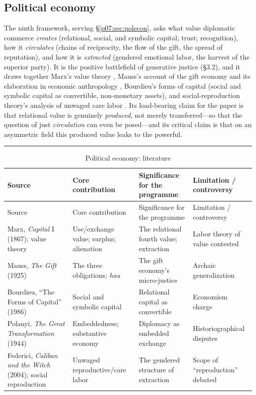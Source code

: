 \documentclass[11pt,a4paper]{article}
\newcommand{\goldrule}{\noindent\textcolor{gold}{\rule{\linewidth}{0.6pt}}\par\vspace{0.4em}}
\newcommand{\xref}[1]{\textcolor{rose}{\S\ref{#1}}}
\newcommand{\pinkref}[1]{\textcolor{rose}{#1}}
\begin{document}
\subsection{Political economy}
The ninth framework, serving \xref{p07:sec:polecon}, asks what value diplomatic commerce \emph{creates} (relational, social, and symbolic capital; trust; recognition), how it \emph{circulates} (chains of reciprocity, the flow of the gift, the spread of reputation), and how it is \emph{extracted} (gendered emotional labor, the harvest of the superior party). It is the positive battlefield of generative justice (\pinkref{§3.2}), and it draws together Marx's value theory \parencite{marx1867capital}, Mauss's account of the gift economy \parencite{mauss1925gift} and its elaboration in economic anthropology \parencite{levistrauss1949,sahlins1972}, Bourdieu's forms of capital \parencite{bourdieu1986forms} (social and symbolic capital as convertible, non-monetary assets), and social-reproduction theory's analysis of unwaged care labor \parencite{federici2004}. Its load-bearing claim for the paper is that relational value is genuinely \emph{produced}, not merely transferred---so that the question of just \emph{circulation} can even be posed---and its critical claim is that on an asymmetric field this produced value leaks to the powerful.

\goldrule
\footnotesize
\begin{longtable}{Y Y Y Y}
\caption{Political economy: literature}\label{p07:tab:lit-polecon}\\
\toprule
{}
Source & Core contribution & Significance for the programme & Limitation / controversy \\
\midrule
\endfirsthead
{}
Source & Core contribution & Significance for the programme & Limitation / controversy \\
\midrule
\endhead
Marx, \emph{Capital} I (1867); value theory & Use/exchange value; surplus; alienation & The relational fourth value; extraction & Labor theory of value contested \\
Mauss, \emph{The Gift} (1925) & The three obligations; \emph{hau} & The gift economy's micro-justice & Archaic generalization \\
Bourdieu, ``The Forms of Capital'' (1986) & Social and symbolic capital & Relational capital as convertible & Economism charge \\
Polanyi, \emph{The Great Transformation} (1944) & Embeddedness; substantive economy & Diplomacy as embedded exchange & Historiographical disputes \\
Federici, \emph{Caliban and the Witch} (2004); social reproduction & Unwaged reproductive/care labor & The gendered structure of extraction & Scope of ``reproduction'' debated \\
\bottomrule
\end{longtable}
\end{document}
